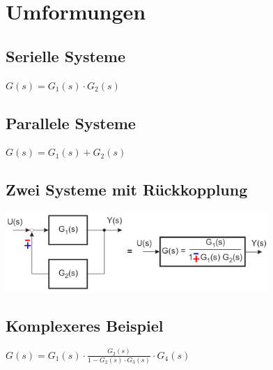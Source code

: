 \section{Umformungen}
	\subsection{Serielle Systeme}
		
		$G(s) = G_1(s) \cdot G_2(s)$
	\subsection{Parallele Systeme}
		
		$G(s) = G_1(s) + G_2(s)$
	\subsection{Zwei Systeme mit Rückkopplung}
		\includegraphics[height=3cm]{./bilder/feedback.png}
	\subsection{Komplexeres Beispiel}
		
		$G(s) = G_1(s) \cdot \frac{G_2(s)}{1-G_2(s) \cdot G_3(s)} \cdot G_4(s)$
